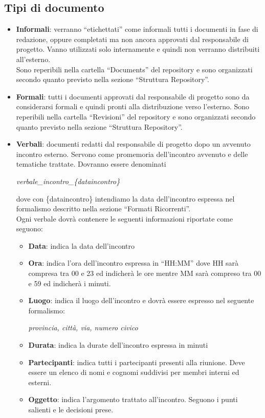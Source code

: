 \subsection{Tipi di documento}
\begin{itemize}
\item \textbf{Informali}: verranno ``etichettati'' come informali tutti i documenti in fase di redazione, oppure completati ma non ancora approvati dal responsabile di progetto. Vanno utilizzati solo internamente e quindi non verranno distribuiti all'esterno.\\
Sono reperibili nella cartella ``Documents'' del repository e sono organizzati secondo quanto previsto nella sezione ``Struttura Repository''.
\item \textbf{Formali}: tutti i documenti approvati dal responsabile di progetto sono da considerarsi formali e quindi pronti alla distribuzione verso l'esterno. Sono reperibili nella cartella ``Revisioni'' del repository e sono organizzati secondo quanto previsto nella sezione ``Struttura Repository''.
\item \textbf{Verbali}: documenti redatti dal responsabile di progetto dopo un avvenuto incontro esterno. Servono come promemoria dell'incontro avvenuto e delle tematiche trattate. Dovranno essere denominati
\begin{center}
\textit{verbale\_incontro\_\{dataincontro\}}
\end{center}
dove con \{dataincontro\} intendiamo la data dell'incontro espressa nel formalismo descritto nella sezione ``Formati Ricorrenti''.\\
Ogni verbale dovrà contenere le seguenti informazioni riportate come seguono:
\begin{itemize}
\item \textbf{Data}: indica la data dell'incontro
\item \textbf{Ora}: indica l'ora dell'incontro espressa in ``HH:MM'' dove HH sarà compresa tra 00 e 23 ed indicherà le ore mentre MM sarà compreso tra 00 e 59 ed indicherà i minuti. 
\item \textbf{Luogo}: indica il luogo dell'incontro e dovrà essere espresso nel seguente formalismo:
\begin{center}
\textit{provincia, città, via, numero civico}
\end{center}
\item \textbf{Durata}: indica la durate dell'incontro espressa in minuti
\item \textbf{Partecipanti}: indica tutti i partecipanti presenti alla riunione. Deve essere un elenco di nomi e cognomi suddivisi per membri interni ed esterni.
\item \textbf{Oggetto}: indica l'argomento trattato all'incontro. Seguono i punti salienti e le decisioni prese.
\end{itemize}
\end{itemize}

